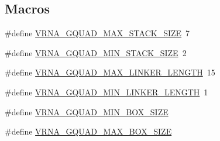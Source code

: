 \subsection*{Macros}
\begin{DoxyCompactItemize}
\item 
\#define \mbox{\hyperlink{group__energy__parameters_gab7b5159125a90babbd3b81319305f35f}{V\+R\+N\+A\+\_\+\+G\+Q\+U\+A\+D\+\_\+\+M\+A\+X\+\_\+\+S\+T\+A\+C\+K\+\_\+\+S\+I\+ZE}}~7
\item 
\#define \mbox{\hyperlink{group__energy__parameters_gae24794ad38d2bf86d4c1e2f24cf35230}{V\+R\+N\+A\+\_\+\+G\+Q\+U\+A\+D\+\_\+\+M\+I\+N\+\_\+\+S\+T\+A\+C\+K\+\_\+\+S\+I\+ZE}}~2
\item 
\#define \mbox{\hyperlink{group__energy__parameters_gaabc251a60f6dbe927dd3a3881a161fb7}{V\+R\+N\+A\+\_\+\+G\+Q\+U\+A\+D\+\_\+\+M\+A\+X\+\_\+\+L\+I\+N\+K\+E\+R\+\_\+\+L\+E\+N\+G\+TH}}~15
\item 
\#define \mbox{\hyperlink{group__energy__parameters_gab0e3cb58bc3a7e3fb08cc05f8e58ddab}{V\+R\+N\+A\+\_\+\+G\+Q\+U\+A\+D\+\_\+\+M\+I\+N\+\_\+\+L\+I\+N\+K\+E\+R\+\_\+\+L\+E\+N\+G\+TH}}~1
\item 
\#define \mbox{\hyperlink{group__energy__parameters_gad7bdd880afca461f97763d79ee57a347}{V\+R\+N\+A\+\_\+\+G\+Q\+U\+A\+D\+\_\+\+M\+I\+N\+\_\+\+B\+O\+X\+\_\+\+S\+I\+ZE}}
\item 
\#define \mbox{\hyperlink{group__energy__parameters_ga56cafabad2f8a7db83f2d5d3b0e8d313}{V\+R\+N\+A\+\_\+\+G\+Q\+U\+A\+D\+\_\+\+M\+A\+X\+\_\+\+B\+O\+X\+\_\+\+S\+I\+ZE}}
\end{DoxyCompactItemize}
